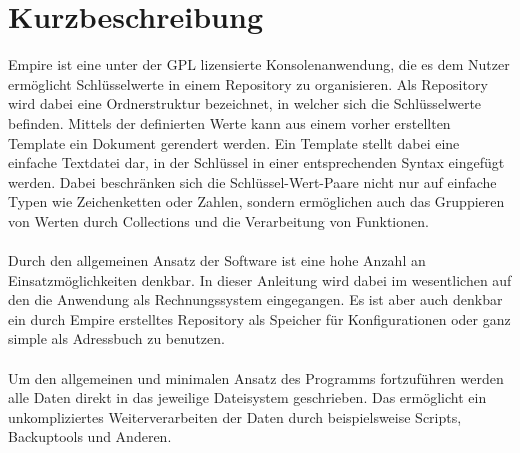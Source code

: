 
\section{Kurzbeschreibung}

Empire ist eine unter der GPL lizensierte Konsolenanwendung, die es dem Nutzer ermöglicht Schlüsselwerte in einem Repository zu organisieren.
Als Repository wird dabei eine Ordnerstruktur bezeichnet, in welcher sich die Schlüsselwerte befinden.
Mittels der definierten Werte kann aus einem vorher erstellten Template ein Dokument gerendert werden. Ein Template stellt dabei eine einfache
Textdatei dar, in der Schlüssel in einer entsprechenden Syntax eingefügt werden. Dabei beschränken sich die Schlüssel-Wert-Paare nicht nur auf einfache
Typen wie Zeichenketten oder Zahlen, sondern ermöglichen auch das Gruppieren von Werten durch Collections und die Verarbeitung von Funktionen.
\\\\
Durch den allgemeinen Ansatz der Software ist eine hohe Anzahl an Einsatzmöglichkeiten denkbar. In dieser Anleitung wird dabei im wesentlichen
auf den die Anwendung als Rechnungssystem eingegangen. Es ist aber auch denkbar ein durch Empire erstelltes Repository als Speicher für Konfigurationen
oder ganz simple als Adressbuch zu benutzen.
\\\\
Um den allgemeinen und minimalen Ansatz des Programms fortzuführen werden alle Daten direkt in das jeweilige Dateisystem geschrieben.
Das ermöglicht ein unkompliziertes Weiterverarbeiten der Daten durch beispielsweise Scripts, Backuptools und Anderen.
